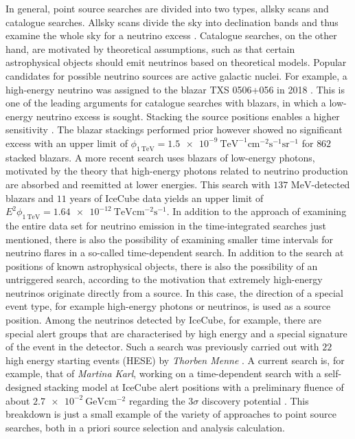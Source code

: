 In general, point source searches are divided into two types, allsky scans and catalogue searches.
Allsky scans divide the sky into declination bands and thus examine the whole sky for a neutrino excess \cite{all_sky_paper}.
Catalogue searches, on the other hand, are motivated by theoretical assumptions, such as that certain astrophysical objects should emit neutrinos based on theoretical models.
Popular candidates for possible neutrino sources are active galactic nuclei.
For example, a high-energy neutrino was assigned to the blazar TXS 0506+056 in 2018 \cite{txs}.
This is one of the leading arguments for catalogue searches with blazars, in which a low-energy neutrino excess is sought.
Stacking the source positions enables a higher sensitivity \cite{stacking_argument}.
The blazar stackings performed prior however \cite{blazar_stacking_2017} showed no significant excess with an upper limit of $\phi_{\SI{1}{\tera\electronvolt}}=\SI{1.5e-9}{\tera\electronvolt\tothe{-1}\centi\meter\tothe{-2}\second\tothe{-1}\steradian\tothe{-1}}$ for $\num{862}$ stacked blazars.
A more recent search \cite{blazar_stacking_2020} uses blazars of low-energy photons, motivated by the theory that high-energy photons related to neutrino production are absorbed and reemitted at lower energies.
This search with $\num{137}$ $\si{\mega\electronvolt}$-detected blazars and $\num{11}$ years of IceCube data yields an upper limit of $E^2\phi_{\SI{1}{\tera\electronvolt}}=\SI{1.64e-12}{\tera\electronvolt\centi\meter\tothe{-2}\second\tothe{-1}}$.
In addition to the approach of examining the entire data set for neutrino emission in the time-integrated searches just mentioned, there is also the possibility of examining smaller time intervals for neutrino flares in a so-called time-dependent search.
In addition to the search at positions of known astrophysical objects, there is also the possibility of an untriggered search, according to the motivation that extremely high-energy neutrinos originate directly from a source.
In this case, the direction of a special event type, for example high-energy photons or neutrinos, is used as a source position.
Among the neutrinos detected by IceCube, for example, there are special alert groups that are characterised by high energy and a special signature of the event in the detector.
Such a search was previously carried out with $\num{22}$ high energy starting events (HESE) by \textit{Thorben Menne} \cite{thorben}.
A current search is, for example, that of \textit{Martina Karl}, working on a time-dependent search with a self-designed stacking model at IceCube alert positions with a preliminary fluence of about $\SI{2.7e-2}{\giga\electronvolt\centi\meter\tothe{-2}}$ regarding the $\num{3}\sigma$ discovery potential \cite{martina}.
This breakdown is just a small example of the variety of approaches to point source searches, both in a priori source selection and analysis calculation.

